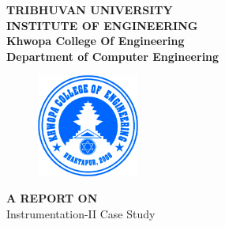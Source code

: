 \begin{center}
	\thispagestyle{empty}
	\large\textbf{TRIBHUVAN UNIVERSITY}\\
	\large\textbf{INSTITUTE OF ENGINEERING }\\
	\vspace{0.1in}
	\LARGE{\textbf{Khwopa College Of Engineering}\\}
	\vspace{0.1cm}
	\large\textbf{Department of Computer Engineering}
	\vspace{0.4in}
	\begin{figure}[h]
			\centering
				\includegraphics[width=0.3\textwidth]{img/Khwopalogo.jpg}
	\end{figure}
	
	\vspace{0.4in}
	\large{\textbf{A REPORT ON}\\Instrumentation-II Case Study\\}
	
	\vspace{0.5in}
	
	

\end{center}

